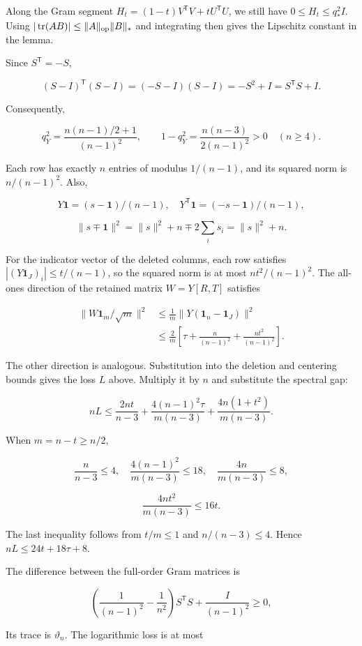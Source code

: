 \documentclass[11pt,a4paper]{article}
\begin{document}
Along the Gram segment \(H_t=(1-t)V^{\mathsf T}V+tU^{\mathsf T}U\), we still have \(0\le H_t\le q_*^2I\). Using \(|\operatorname{tr}(AB)|\le\|A\|_{\rm op}\|B\|_*\) and integrating then gives the Lipschitz constant in the lemma.

Since \(S^{\mathsf T}=-S\),

\[
(S-I)^{\mathsf T}(S-I)=(-S-I)(S-I)=-S^2+I=S^{\mathsf T}S+I.
\]

Consequently,

\[
q_Y^2=\frac{n(n-1)/2+1}{(n-1)^2},\qquad
1-q_Y^2=\frac{n(n-3)}{2(n-1)^2}>0\quad(n\ge4).
\]

Each row has exactly \(n\) entries of modulus \(1/(n-1)\), and its squared norm is \(n/(n-1)^2\). Also,

\[
Y\mathbf1=(s-\mathbf1)/(n-1),\quad
Y^{\mathsf T}\mathbf1=(-s-\mathbf1)/(n-1),
\]

\[
\|s\mp\mathbf1\|^2=\|s\|^2+n\mp2\sum_i s_i=\|s\|^2+n.
\]

For the indicator vector of the deleted columns, each row satisfies \(|(Y\mathbf1_J)_i|\le t/(n-1)\), so the squared norm is at most \(nt^2/(n-1)^2\). The all-ones direction of the retained matrix \(W=Y[R,T]\) satisfies

\[
\begin{aligned}
\|W\mathbf1_m/\sqrt m\|^2
&\le\frac1m\|Y(\mathbf1_n-\mathbf1_J)\|^2\\
&\le\frac2m\left[\tau+\frac n{(n-1)^2}+\frac{nt^2}{(n-1)^2}\right].
\end{aligned}
\]

The other direction is analogous. Substitution into the deletion and centering bounds gives the loss \(L\) above. Multiply it by \(n\) and substitute the spectral gap:

\[
nL\le\frac{2nt}{n-3}
+\frac{4(n-1)^2\tau}{m(n-3)}
+\frac{4n(1+t^2)}{m(n-3)}.
\]

When \(m=n-t\ge n/2\),

\[
\frac n{n-3}\le4,\quad
\frac{4(n-1)^2}{m(n-3)}\le18,\quad
\frac{4n}{m(n-3)}\le8,
\]

\[
\frac{4nt^2}{m(n-3)}\le16t.
\]

The last inequality follows from \(t/m\le1\) and \(n/(n-3)\le4\). Hence \(nL\le24t+18\tau+8\).

The difference between the full-order Gram matrices is

\[
\left(\frac1{(n-1)^2}-\frac1{n^2}\right)S^{\mathsf T}S
+\frac I{(n-1)^2}\ge0,
\]

Its trace is \(\vartheta_n\). The logarithmic loss is at most
\end{document}
